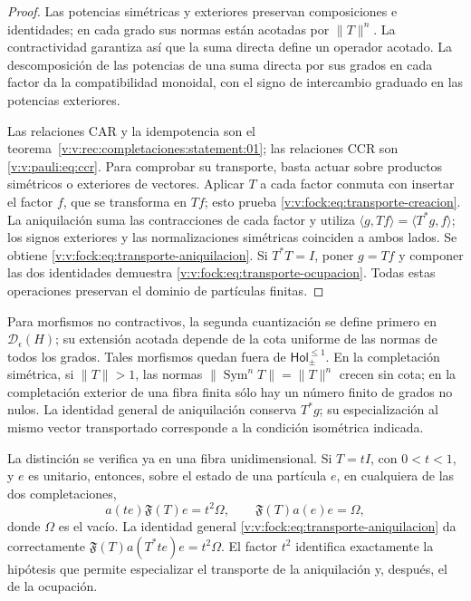 \begin{proof}
Las potencias simétricas y exteriores preservan composiciones e identidades;
en cada grado sus normas están acotadas por \(\|T\|^n\). La contractividad
garantiza así que la suma directa define un operador acotado. La
descomposición de las potencias de una suma directa por sus grados en cada
factor da la compatibilidad monoidal, con el signo de intercambio graduado
en las potencias exteriores.

Las relaciones CAR y la idempotencia son el
teorema~\ref{v:v:rec:completaciones:statement:01}; las relaciones CCR son
\eqref{v:v:pauli:eq:ccr}. Para comprobar su transporte, basta actuar sobre
productos simétricos o exteriores de vectores. Aplicar \(T\) a cada factor
conmuta con insertar el factor \(f\), que se transforma en \(Tf\);
esto prueba \eqref{v:v:fock:eq:transporte-creacion}. La aniquilación suma las
contracciones de cada factor y utiliza
\(\langle g,Tf\rangle=\langle T^*g,f\rangle\); los signos exteriores y
las normalizaciones simétricas coinciden a ambos lados. Se obtiene
\eqref{v:v:fock:eq:transporte-aniquilacion}. Si \(T^*T=I\), poner \(g=Tf\)
y componer las dos identidades demuestra
\eqref{v:v:fock:eq:transporte-ocupacion}. Todas estas operaciones preservan
el dominio de partículas finitas.
\end{proof}

Para morfismos no contractivos, la segunda cuantización se define primero
en \(\mathcal D_\epsilon(H)\); su extensión acotada depende de la cota
uniforme de las normas de todos los grados. Tales morfismos quedan fuera
de \(\mathsf{Hol}_{\pm}^{\leq1}\). En la completación simétrica, si
\(\|T\|>1\), las normas \(\|\operatorname{Sym}^nT\|=\|T\|^n\)
crecen sin cota; en la completación exterior de una fibra finita sólo
hay un número finito de grados no nulos. La identidad general de
aniquilación conserva \(T^*g\); su especialización al mismo vector
transportado corresponde a la condición isométrica indicada.

La distinción se verifica ya en una fibra unidimensional. Si
\(T=tI\), con \(0<t<1\), y \(e\) es unitario, entonces, sobre el estado
de una partícula \(e\), en cualquiera de las dos completaciones,
\begin{equation}
 a(te)\mathfrak F(T)e=t^2\Omega,
 \qquad \mathfrak F(T)a(e)e=\Omega,
 \label{v:v:fock:eq:control-no-isometrico}
\end{equation}
donde \(\Omega\) es el vacío. La identidad general
\eqref{v:v:fock:eq:transporte-aniquilacion} da correctamente
\(\mathfrak F(T)a(T^*te)e=t^2\Omega\). El factor \(t^2\) identifica
exactamente la hipótesis que permite especializar el transporte de la
aniquilación y, después, el de la ocupación.


